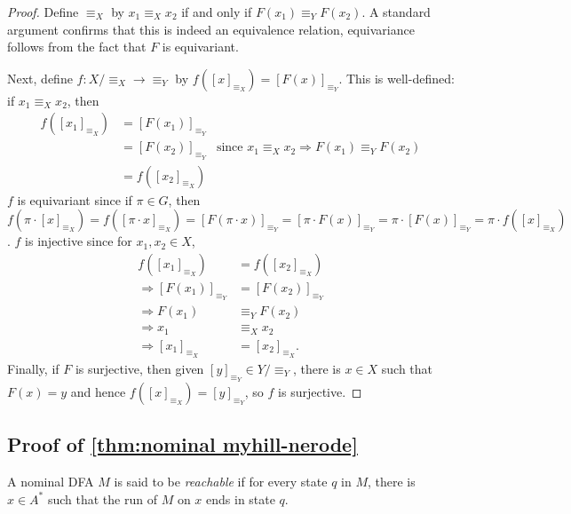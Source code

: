\documentclass[runningheads]{llncs}
\begin{document}
  \begin{proof}
    Define $\equiv_X$ by $x_1 \equiv_X x_2$ if and only if $F(x_1) \equiv_Y F(x_2)$.
    A standard argument confirms that this is indeed an equivalence relation, equivariance follows from the fact that $F$ is equivariant.

    Next, define $f : X / \equiv_X \to \equiv_Y$ by $f([x]_{\equiv_X}) = [F(x)]_{\equiv_Y}$.
    This is well-defined: if $x_1 \equiv_X x_2$, then 
    \begin{align*}
        f([x_1]_{\equiv_X}) &= [F(x_1)]_{\equiv_Y} \\
        &= [F(x_2)]_{\equiv_Y} & \text{since } x_1 \equiv_X x_2 \Rightarrow F(x_1) \equiv_Y F(x_2) \\
        &= f([x_2]_{\equiv_X})
    \end{align*}
    $f$ is equivariant since if $\pi \in G$, then $f(\pi \cdot [x]_{\equiv_X}) = f([\pi \cdot x]_{\equiv_X}) = [F(\pi \cdot x)]_{\equiv_Y} = [\pi \cdot F(x)]_{\equiv_Y} = \pi \cdot [F(x)]_{\equiv_Y} = \pi \cdot f([x]_{\equiv_X})$.
    $f$ is injective since for $x_1, x_2 \in X$,
    \begin{align*}
        f([x_1]_{\equiv_X}) &= f([x_2]_{\equiv_X}) \\
        \Rightarrow [F(x_1)]_{\equiv_Y} &= [F(x_2)]_{\equiv_Y} \\
        \Rightarrow F(x_1) &\equiv_Y F(x_2) \\
        \Rightarrow x_1 &\equiv_X x_2 \\
        \Rightarrow [x_1]_{\equiv_X} &= [x_2]_{\equiv_X}.
    \end{align*}
    Finally, if $F$ is surjective, then given $[y]_{\equiv_Y} \in Y / \equiv_Y$, there is $x \in X$ such that $F(x) = y$ and hence $f([x]_{\equiv_X}) = [y]_{\equiv_Y}$, so $f$ is surjective.
\end{proof}

\subsection{Proof of \autoref{thm:nominal myhill-nerode}} \label{appendix:proof of nominal myhill-nerode}


\begin{definition}
    A nominal DFA $M$ is said to be \emph{reachable} if for every state $q$ in $M$, there is $x \in A^*$ such that the run of $M$ on $x$ ends in state $q$.
\end{definition}
\end{document}
